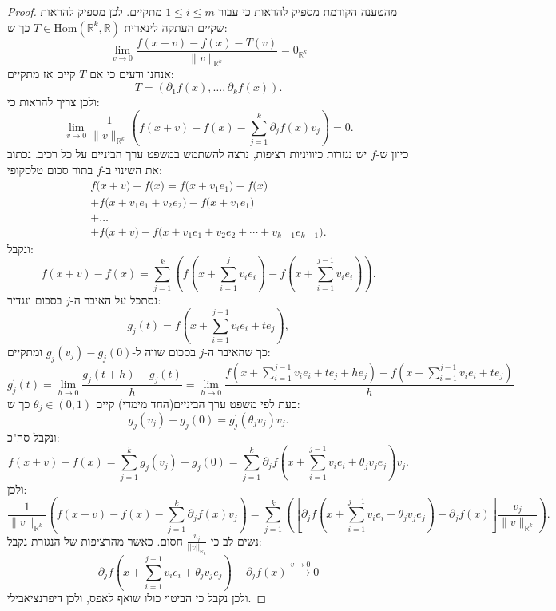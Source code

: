 \documentclass{tstextbook}
\begin{document}
\begin{proof}
מהטענה הקודמת מספיק להראות כי עבור \(1\leq i\leq m\) מתקיים. לכן מספיק להראות שקיים העתקה לינארית \(T\in \mathrm{Hom}\left( \mathbb{R}^k,\mathbb{R} \right)\) כך ש:
$$\operatorname*{lim}_{ v \to0}{\frac{f\left( x+ v  \right)-f(x)-T\left(  v  \right)}{\| v \|_{\mathbb{R}^{k}}}}=0_{\mathbb{R}^k}$$
אנחנו ודעים כי אם \(T\) קיים אז מתקיים:
$$T=\left(\partial_{1}f(x),\ldots,\partial_{k}f(x)\right).$$
ולכן צריך להראות כי:
$$\operatorname*{lim}_{ v \to0}{\frac{1}{\| v \|_{\mathbb{R}^{k}}}}\left(f(x+ v )-f(x)-\sum_{j=1}^{k}\partial_{j}f(x) v _{j}\right)=0.$$
כיוון ש-\(f\) יש נגזרות כיוויניות רציפות, נרצה להשתמש במשפט ערך הביניים על כל רכיב. נכתוב את השינוי ב-\(f\) בתור סכום טלסקופי:
$$\begin{gather}{f{\big(}x+ v {\big)}-f{\big(}x{\big)}=f{\big(}x+ v _{1}e_{1}{\big)}-f{\big(}x{\big)}}\\ {+f{\big(}x+ v _{1}e_{1}+ v _{2}e_{2}{\big)}-f{\big(}x+ v _{1}e_{1}{\big)}}\\ {+\ldots}\\ {+f{\big(}x+ v {\big)}-f{\big(}x+ v _{1}e_{1}+ v _{2}e_{2}+\cdots+ v _{k-1}e_{k-1}{\big)}.}\end{gather}$$
ונקבל:
$$f(x+ v )-f(x)=\sum_{j=1}^{k}\left(f\left(x+\sum_{i=1}^{j} v _{i}e_{i}\right)-f\left(x+\sum_{i=1}^{j-1} v _{i}e_{i}\right)\right).$$
נסתכל על האיבר ה-\(j\) בסכום ונגדיר:
$$g_{j}(t)=f\left(x+\sum_{i=1}^{j-1} v _{i}e_{i}+t e_{j}\right),$$
כך שהאיבר ה-\(j\) בסכום שווה ל-\(g_{j}(v_{j})-g_{j}(0)\) ומתקיים:
$$g_{j}^{\prime}(t)=\operatorname*{lim}_{h\to0}{\frac{g_{j}(t+h)-g_{j}(t)}{h}}=\operatorname*{lim}_{h\to0}{\frac{f\left(x+\sum_{i=1}^{j-1} v _{i}e_{i}+t e_{j}+h e_{j}\right)-f\left(x+\sum_{i=1}^{j-1} v _{i}e_{i}+t e_{j}\right)}{h}}$$
כעת לפי משפט ערך הביניים(החד מימדי) קיים \(\theta_{j}\in(0,1)\) כך ש:
$$g_{j}( v _{j})-g_{j}(0)=g_{j}^{\prime}(\theta_{j} v _{j}) v _{j}.$$
ונקבל סה"כ:
$$f(x+ v )-f(x)=\sum_{j=1}^{k}g_{j}( v _{j})-g_{j}(0)=\sum_{j=1}^{k}\partial_{j}f\left(x+\sum_{i=1}^{j-1} v _{i}e_{i}+\theta_{j} v _{j}e_{j}\right) v _{j}.$$
ולכן:
$${\frac{1}{\|v\|_{\mathbb{R}^{k}}}}\left(f(x+ v )-f(x)-\sum_{j=1}^{k}\partial_{j}f(x) v _{j}\right)=\sum_{j=1}^{k}\left(\left[\partial_{j}f\left(x+\sum_{i=1}^{j-1} v _{i}e_{i}+\theta_{j} v _{j}e_{j}\right)-\partial_{j}f(x)\right]{\frac{ v _{j}}{\|v\|_{\mathbb{R}^{k}}}}\right).$$
נשים לב כי \(\frac{v_{j}}{||v||_{\mathbb{R}_{k}}}\) חסום. כאשר מהרציפות של הנגזרת נקבל:
$$\partial_{j}f\left(x+\sum_{i=1}^{j-1} v _{i}e_{i}+\theta_{j} v _{j}e_{j}\right)-\partial_{j}f(x)\xrightarrow{v\to 0} 0$$
ולכן נקבל כי הביטוי כולו שואף לאפס, ולכן דיפרנציאבילי.

\end{proof}
\end{document}
